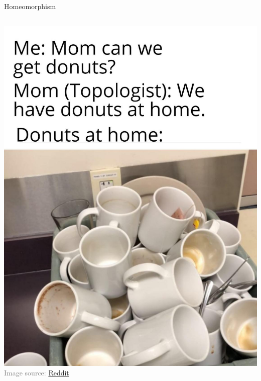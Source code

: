 \begin{frame}{Homeomorphism}
\begin{columns}
\begin{column}{0.4\linewidth}
{	\includegraphics[width=\linewidth]{img/meme}
	\textcolor{gray}{\fontsize{6.5}{10}\selectfont Image source: \href{https://www.reddit.com/r/mathmemes/comments/eilb2c/donuts_at_home/}{Reddit}}
}
\end{column}
\end{columns}
\end{frame}

